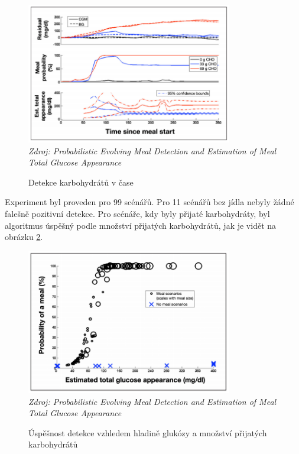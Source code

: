 \begin{figure}[H]
\caption{Detekce karbohydrátů v čase}
\label{fig:analyza:diff1}
\centering
\includegraphics[width=0.8\textwidth]{img/analyzaCHO/diff1.png}\\
\textit{Zdroj: Probabilistic Evolving Meal Detection and Estimation of Meal Total Glucose Appearance \citep{analyzaCHO.Diff}}
\end{figure}

Experiment byl proveden pro 99 scénářů. Pro 11 scénářů bez jídla nebyly žádné falešně pozitivní detekce. Pro scénáře, kdy byly přijaté karbohydráty, byl algoritmus úspěšný podle množství přijatých karbohydrátů, jak je vidět na obrázku \ref{fig:analyza:diff2}.

\begin{figure}[H]
\caption{Úspěšnost detekce vzhledem hladině glukózy a množství přijatých karbohydrátů}
\label{fig:analyza:diff2}
\centering
\includegraphics[width=0.8\textwidth]{img/analyzaCHO/diff2.png}\\
\textit{Zdroj: Probabilistic Evolving Meal Detection and Estimation of Meal Total Glucose Appearance \citep{analyzaCHO.Diff}}
\end{figure}


